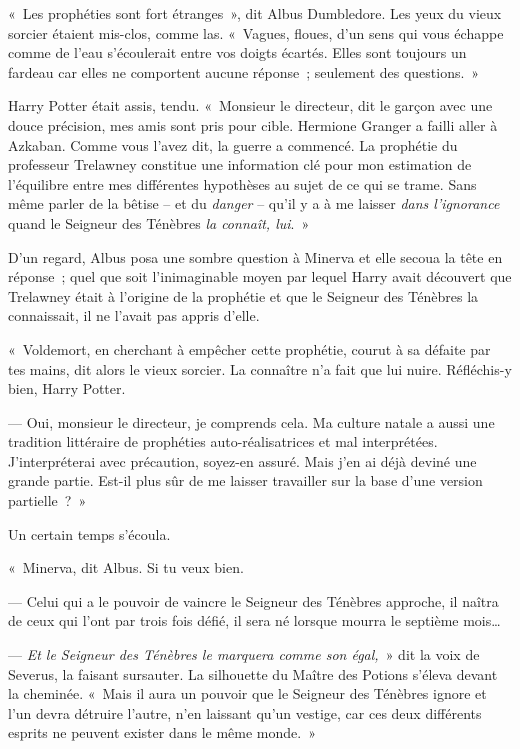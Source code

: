 «~Les prophéties sont fort étranges~», dit Albus Dumbledore.
Les yeux du vieux sorcier étaient mis-clos, comme las.
«~Vagues, floues, d'un sens qui vous échappe comme de l'eau s'écoulerait entre vos doigts écartés.
Elles sont toujours un fardeau car elles ne comportent aucune réponse~; seulement des questions.~»

Harry Potter était assis, tendu.
«~Monsieur le directeur, dit le garçon avec une douce précision, mes amis sont pris pour cible.
Hermione Granger a failli aller à Azkaban.
Comme vous l'avez dit, la guerre a commencé.
La prophétie du professeur Trelawney constitue une information clé pour mon estimation de l'équilibre entre mes différentes hypothèses au sujet de ce qui se trame.
Sans même parler de la bêtise -- et du \emph{danger} -- qu'il y a à me laisser \emph{dans l'ignorance} quand le Seigneur des Ténèbres \emph{la connaît, lui}.~»

D'un regard, Albus posa une sombre question à Minerva et elle secoua la tête en réponse~; quel que soit l'inimaginable moyen par lequel Harry avait découvert que Trelawney était à l'origine de la prophétie et que le Seigneur des Ténèbres la connaissait, il ne l'avait pas appris d'elle.

«~Voldemort, en cherchant à empêcher cette prophétie, courut à sa défaite par tes mains, dit alors le vieux sorcier.
La connaître n'a fait que lui nuire.
Réfléchis-y bien, Harry Potter.

--- Oui, monsieur le directeur, je comprends cela.
Ma culture natale a aussi une tradition littéraire de prophéties auto-réalisatrices et mal interprétées.
J'interpréterai avec précaution, soyez-en assuré.
Mais j'en ai déjà deviné une grande partie.
Est-il plus sûr de me laisser travailler sur la base d'une version partielle~?~»

Un certain temps s'écoula.

«~Minerva, dit Albus.
Si tu veux bien.

--- Celui qui a le pouvoir de vaincre le Seigneur des Ténèbres approche, il naîtra de ceux qui l'ont par trois fois défié, il sera né lorsque mourra le septième mois…

--- \emph{Et le Seigneur des Ténèbres le marquera comme son égal,}~» dit la voix de Severus, la faisant sursauter.
La silhouette du Maître des Potions s'éleva devant la cheminée.
«~Mais il aura un pouvoir que le Seigneur des Ténèbres ignore et l'un devra détruire l'autre, n'en laissant qu'un vestige, car ces deux différents esprits ne peuvent exister dans le même monde.~»

